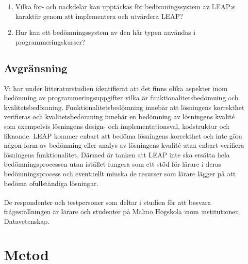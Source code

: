 \documentclass[a4paper,11pt]{article}
\begin{document}
{\begin{enumerate}
\item
Vilka för- och nackdelar kan upptäckas för bedömningssystem av LEAP:s karaktär genom att implementera och utvärdera LEAP?
\item
Hur kan ett bedömningssystem av den här typen användas i programmeringskurser?
\end{enumerate}

\subsection{Avgränsning}

Vi har under litteraturstudien identifierat att det finns olika aspekter inom bedömning av programmeringsuppgifter \cite{ala-mutka} vilka är funktionalitetsbedömning och kvalitetsbedömning. Funktionalitetsbedömning innebär att lösningens korrekthet verifieras och kvalitetsbedömning innebär en bedömning av lösningens kvalité som exempelvis lösningens design- och implementationsval, kodstruktur och liknande. LEAP kommer enbart att bedöma lösningens korrekthet och inte göra någon form av bedömning eller analys av lösningens kvalité utan enbart verifiera lösningens funktionalitet. Därmed är tanken att LEAP inte ska ersätta hela bedömningsprocessen utan istället fungera som ett stöd för lärare i deras bedömningsprocess och eventuellt minska de resurser som lärare lägger på att bedöma ofullständiga lösningar.
\\
\\
De respondenter och testpersoner som deltar i studien för att besvara frågeställningen är lärare och studenter på Malmö Högskola inom institutionen Datavetenskap.

\newpage
\section{Metod}\label{Metod}

}
\end{document}

